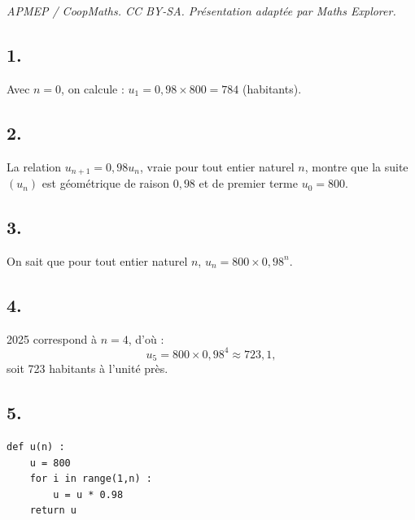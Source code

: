 \documentclass[10pt]{article}
\begin{document}
\noindent\textit{APMEP / CoopMaths. CC BY-SA. Présentation adaptée par Maths Explorer.}\par\medskip
\subsection*{1.}

Avec \(n = 0\), on calcule : \(u_1 = 0{,}98 \times 800 = 784\) (habitants).

\subsection*{2.}

La relation \(u_{n+1} = 0{,}98 u_n\), vraie pour tout entier naturel \(n\), montre que la suite \((u_n)\) est géométrique de raison \(0{,}98\) et de premier terme \(u_0 = 800\).

\subsection*{3.}

On sait que pour tout entier naturel \(n\), \(u_n = 800 \times 0{,}98^n\).

\subsection*{4.}

2025 correspond à \(n = 4\), d'où :
\[
u_5 = 800 \times 0{,}98^4 \approx 723{,}1,
\]
soit 723 habitants à l'unité près.

\subsection*{5.}

\begin{lstlisting}[style=python]
def u(n) :	
	u = 800
	for i in range(1,n) :
		u = u * 0.98
	return u
\end{lstlisting}
\end{document}
